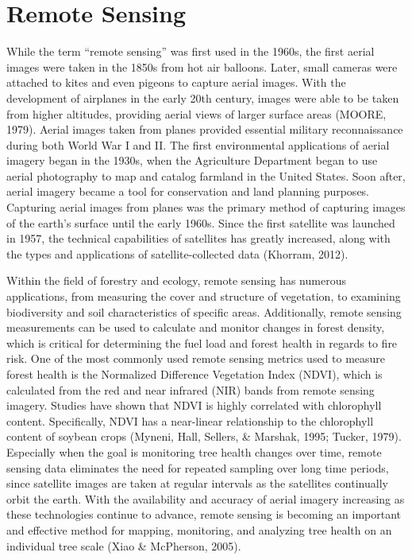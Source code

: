 \documentclass[12pt,twoside]{reedthesis}
\begin{document}
\hypertarget{remote-sensing}{%
\section{Remote Sensing}\label{remote-sensing}}

While the term ``remote sensing'' was first used in the 1960s, the first aerial images were taken in the 1850s from hot air balloons. Later, small cameras were attached to kites and even pigeons to capture aerial images. With the development of airplanes in the early 20th century, images were able to be taken from higher altitudes, providing aerial views of larger surface areas (MOORE, 1979). Aerial images taken from planes provided essential military reconnaissance during both World War I and II. The first environmental applications of aerial imagery began in the 1930s, when the Agriculture Department began to use aerial photography to map and catalog farmland in the United States. Soon after, aerial imagery became a tool for conservation and land planning purposes. Capturing aerial images from planes was the primary method of capturing images of the earth's surface until the early 1960s. Since the first satellite was launched in 1957, the technical capabilities of satellites has greatly increased, along with the types and applications of satellite-collected data (Khorram, 2012).

Within the field of forestry and ecology, remote sensing has numerous applications, from measuring the cover and structure of vegetation, to examining biodiversity and soil characteristics of specific areas. Additionally, remote sensing measurements can be used to calculate and monitor changes in forest density, which is critical for determining the fuel load and forest health in regards to fire risk. One of the most commonly used remote sensing metrics used to measure forest health is the Normalized Difference Vegetation Index (NDVI), which is calculated from the red and near infrared (NIR) bands from remote sensing imagery. Studies have shown that NDVI is highly correlated with chlorophyll content. Specifically, NDVI has a near-linear relationship to the chlorophyll content of soybean crops (Myneni, Hall, Sellers, \& Marshak, 1995; Tucker, 1979). Especially when the goal is monitoring tree health changes over time, remote sensing data eliminates the need for repeated sampling over long time periods, since satellite images are taken at regular intervals as the satellites continually orbit the earth. With the availability and accuracy of aerial imagery increasing as these technologies continue to advance, remote sensing is becoming an important and effective method for mapping, monitoring, and analyzing tree health on an individual tree scale (Xiao \& McPherson, 2005).
\end{document}
